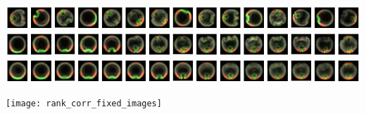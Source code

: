 \documentclass[12pt]{minimal}
\begin{document}
\noindent
\hspace{0.2cm}
\begin{minipage}[b]{12.5cm}
\centering
{}
\includegraphics{fixed_images_unregistered_unordered_subsampled}\\
\vspace{0.2cm}
\includegraphics{fixed_images_registered_ordered_subsampled}\\
\vspace{0.2cm}
\includegraphics{fixed_images_average_trajectory}
\end{minipage}
%
\hspace{0.3cm}
%
\hspace{-0.25cm}
\texttt{[image: rank\_corr\_fixed\_images]}
\end{document}
